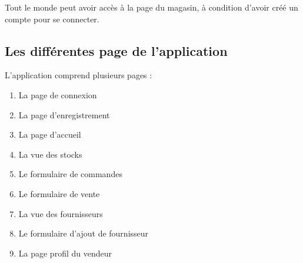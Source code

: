 \documentclass[12pt]{report}
\begin{document}
    Tout le monde peut avoir accès à la page du magasin, à condition d'avoir créé un compte pour se connecter.
    \newline

    \subsection*{Les différentes page de l'application}
    L'application comprend plusieurs pages :
    \begin{enumerate}
        \item La page de connexion
        \item La page d'enregistrement
        \item La page d'accueil
        \item La vue des stocks
        \item Le formulaire de commandes
        \item Le formulaire de vente
        \item La vue des fournisseurs
        \item Le formulaire d'ajout de fournisseur
        \item La page profil du vendeur
    \end{enumerate}
\end{document}
